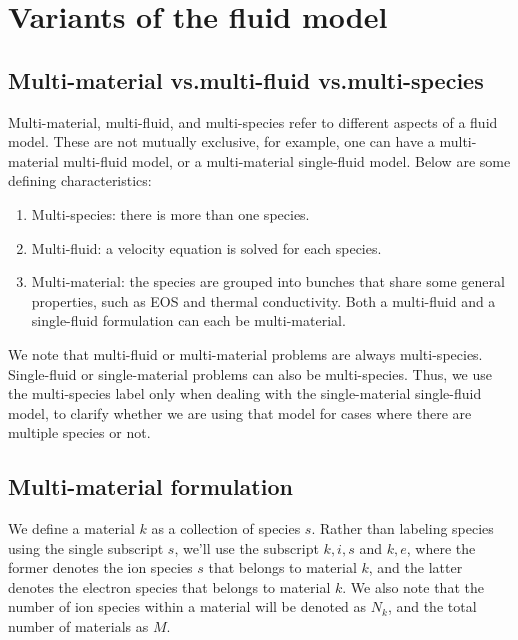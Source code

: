 \documentclass[a4paper,11pt]{report}
\begin{document}
\chapter{Variants of the fluid model}

\section{Multi-material vs.\@ multi-fluid vs.\@ multi-species}
Multi-material, multi-fluid, and multi-species refer to different aspects of a fluid model. These are not mutually exclusive, for example, one can have a multi-material multi-fluid model, or a multi-material single-fluid model. Below are some defining characteristics:
\begin{enumerate}
    \item Multi-species: there is more than one species.
    \item Multi-fluid: a velocity equation is solved for each species. 
    \item Multi-material: the species are grouped into bunches that share some general properties, such as EOS and thermal conductivity. Both a multi-fluid and a single-fluid formulation can each be multi-material. 
\end{enumerate}

We note that multi-fluid or multi-material problems are always multi-species. Single-fluid or single-material problems can also be multi-species. Thus, we use the multi-species label only when dealing with the single-material single-fluid model, to clarify whether we are using that model for cases where there are multiple species or not.

\section{Multi-material formulation}
We define a material $k$ as a collection of species $s$. Rather than labeling species using the single subscript $s$, we'll use the subscript $k,i,s$ and $k,e$, where the former denotes the ion species $s$ that belongs to material $k$, and the latter denotes the electron species that belongs to material $k$. We also note that the number of ion species within a material will be denoted as $N_k$, and the total number of materials as $M$.
\end{document}
